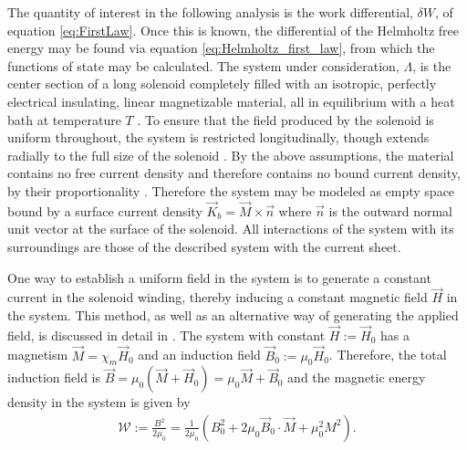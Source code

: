 \documentclass[english,12pt]{ttuthes}
\begin{document}
The quantity of interest in the following analysis is the work
differential, $\delta W$, of equation \eqref{eq:FirstLaw}.  Once this is known,
the differential of the Helmholtz free energy may be found via equation
\eqref{eq:Helmholtz_first_law}, from which the functions of state
may be calculated. The system under consideration, $\Lambda$,
is the center section of a long solenoid completely filled with an
isotropic, perfectly electrical insulating, linear magnetizable
material, all in equilibrium with a heat bath at temperature $T$
\cite{Robertson-1993}. To ensure that the field produced by the
solenoid is uniform throughout, the system is restricted
longitudinally, though extends radially to the full size of the
solenoid \cite{Robertson-1993}. By the above assumptions, the material
contains no free current density and therefore contains no bound
current density, by their proportionality
\cite{Robertson-1993}. Therefore the system may be modeled as empty
space bound by a surface current density $\vec{K}_b=\vec{M}\times\vec{n}$
where $\vec{n}$ is the outward normal unit vector at the surface of
the solenoid. All interactions of the system with its surroundings are
those of the described system with the current sheet.

One way to establish a uniform field in the system is to generate a
constant current in the solenoid winding, thereby inducing a constant
magnetic field $\vec{H}$ in the system. This method, as well as an
alternative way of generating the applied field, is discussed in detail
in \cite{Robertson-1993}. The system with constant
$\vec{H}:=\vec{H}_0$ has a magnetism $\vec{M}=\chi_m\vec{H}_0$ and an
induction field $\vec{B}_0:=\mu_0\vec{H}_0$. Therefore, the total
induction field is
$\vec{B}=\mu_0(\vec{M}+\vec{H}_0)=\mu_0\vec{M}+\vec{B}_0$ and the magnetic
energy density in the system is given by
\cite{Robertson-1993,Griffiths-1999}  
%
\begin{align}\label{eq:Magnetic_energy_partition}
  \mathcal{W}:=\frac{B^2}{2\mu_0}=\frac{1}{2\mu_0}(B_0^2+2\mu_0\vec{B}_0\cdot\vec{M}+\mu_0^2M^2).
\end{align}
%
\end{document}
